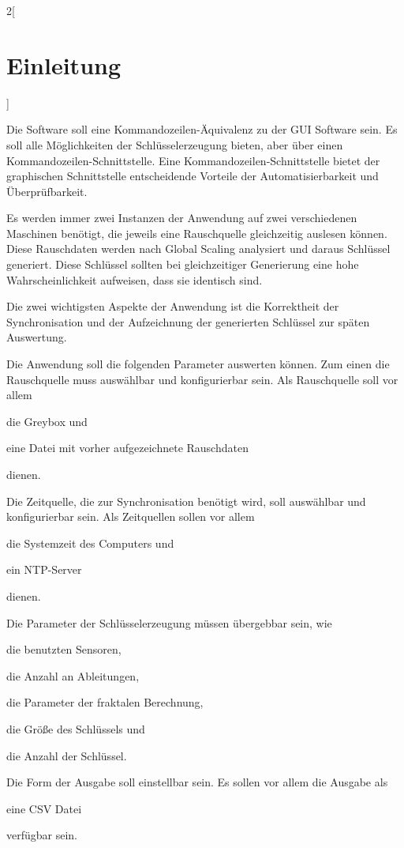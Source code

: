 \begin{multicols*}{2}[\chapter{Einleitung}]
 
Die Software soll eine Kommandozeilen-Äquivalenz zu der GUI Software sein. Es
soll alle Möglichkeiten der Schlüsselerzeugung bieten, aber über einen
Kommandozeilen-Schnittstelle. Eine Kommandozeilen-Schnittstelle bietet der
graphischen Schnittstelle entscheidende Vorteile der Automatisierbarkeit und
Überprüfbarkeit.

Es werden immer zwei Instanzen der Anwendung auf zwei verschiedenen Maschinen
benötigt, die jeweils eine Rauschquelle gleichzeitig auslesen können. Diese
Rauschdaten werden nach Global Scaling analysiert und daraus Schlüssel generiert.
Diese Schlüssel sollten bei gleichzeitiger Generierung eine hohe Wahrscheinlichkeit
aufweisen, dass sie identisch sind.

Die zwei wichtigsten Aspekte der Anwendung ist die Korrektheit der Synchronisation
und der Aufzeichnung der generierten Schlüssel zur späten Auswertung.

Die Anwendung soll die folgenden Parameter auswerten können. Zum einen die
Rauschquelle muss auswählbar und konfigurierbar sein. Als Rauschquelle soll vor
allem
\begin{inparaenum}[a)]
\item die Greybox und
\item eine Datei mit vorher aufgezeichnete Rauschdaten
\end{inparaenum}
dienen.

Die Zeitquelle, die zur Synchronisation benötigt wird, soll auswählbar und
konfigurierbar sein. Als Zeitquellen sollen vor allem
\begin{inparaenum}[a)]
\item die Systemzeit des Computers und
\item ein NTP-Server
\end{inparaenum}
dienen.

Die Parameter der Schlüsselerzeugung müssen übergebbar sein, wie
\begin{inparaenum}[a)]
\item die benutzten Sensoren,
\item die Anzahl an Ableitungen,
\item die Parameter der fraktalen Berechnung,
\item die Größe des Schlüssels und
\item die Anzahl der Schlüssel.
\end{inparaenum}

Die Form der Ausgabe soll einstellbar sein. Es sollen vor allem die Ausgabe als 
\begin{inparaenum}[a)]
\item eine CSV Datei
\end{inparaenum}
verfügbar sein.

\end{multicols*}




